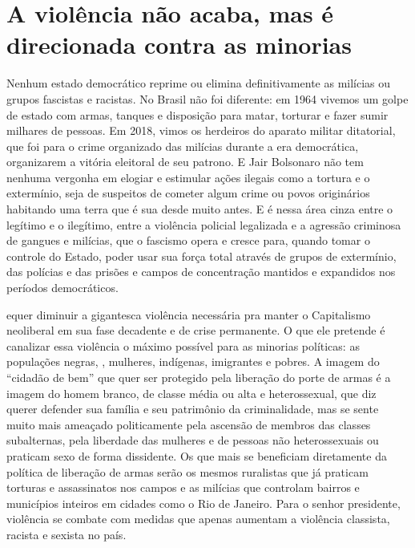 \section{A violência não acaba, mas é direcionada contra as minorias}

Nenhum estado democrático reprime ou elimina definitivamente as milícias ou grupos fascistas e racistas. No Brasil não foi diferente: em 1964 vivemos um golpe de estado com armas, tanques e disposição para matar, torturar e fazer sumir milhares de pessoas. Em 2018, vimos os herdeiros do aparato militar ditatorial, que foi para o crime organizado das milícias durante a era democrática, organizarem a vitória eleitoral de seu patrono. E Jair Bolsonaro não tem nenhuma vergonha em elogiar e estimular ações ilegais como a tortura e o extermínio, seja de suspeitos de cometer algum crime ou povos originários habitando uma terra que é sua desde muito antes. E é nessa área cinza entre o legítimo e o ilegítimo, entre a violência policial legalizada e a agressão criminosa de gangues e milícias, que o fascismo opera e cresce para, quando tomar o controle do Estado, poder usar sua força total através de grupos de extermínio, das polícias e das prisões e campos de concentração mantidos e expandidos nos períodos democráticos.

equer diminuir a gigantesca violência necessária pra manter o Capitalismo neoliberal em sua fase decadente e de crise permanente. O que ele pretende é canalizar essa violência o máximo possível para as minorias políticas: as populações negras, , mulheres, indígenas, imigrantes e pobres. A imagem do ``cidadão de bem'' que quer ser protegido pela liberação do porte de armas é a imagem do homem branco, de classe média ou alta e heterossexual, que diz querer defender sua família e seu patrimônio da criminalidade, mas se sente muito mais ameaçado politicamente pela ascensão de membros das classes subalternas, pela liberdade das mulheres e de pessoas não heterossexuais ou praticam sexo de forma dissidente. Os que mais se beneficiam diretamente da política de liberação de armas serão os mesmos ruralistas que já praticam torturas e assassinatos nos campos e as milícias que controlam bairros e municípios inteiros em cidades como o Rio de Janeiro. Para o senhor presidente, violência se combate com medidas que apenas aumentam a violência classista, racista e sexista no país.

